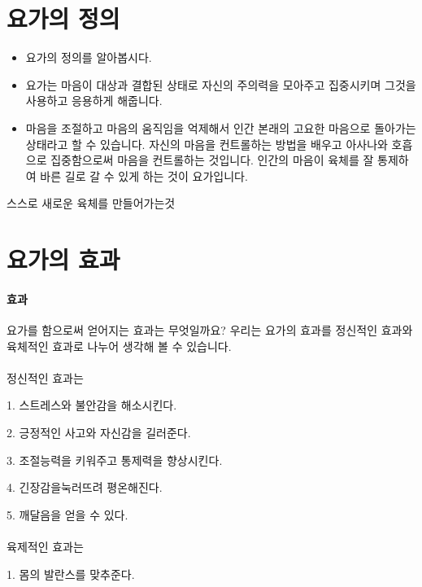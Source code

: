 \documentclass[12pt, a4paper, oneside]{book}
\let\stdsection\section
\renewcommand\section{\newpage\stdsection}
\begin{document}
\section{요가의 정의}


		\begin{itemize}[topsep=0.0em, parsep=0.0em, itemsep=0em, leftmargin=6.0em, labelwidth=3em, labelsep=3em] 
			\item 	요가의 정의를 알아봅시다.
			\item 	요가는 마음이 대상과 결합된 상태로 자신의 주의력을 모아주고 집중시키며 그것을 사용하고 응용하게 해줍니다.
			\item 	마음을 조절하고 마음의 움직임을 억제해서 인간 본래의 고요한 마음으로 돌아가는 상태라고  할 수 있습니다. 
					자신의 마음을 컨트롤하는 방법을 배우고 아사나와 호흡으로 집중함으로써 마음을 컨트롤하는 것입니다. 
					인간의 마음이 육체를 잘 통제하여 바른 길로 갈 수 있게 하는 것이 요가입니다.
		\end{itemize}

			스스로 새로운 육체를 만들어가는것


\section{요가의 효과}


\paragraph{효과}
요가를 함으로써 얻어지는 효과는 무엇일까요?
우리는 요가의 효과를 정신적인 효과와 육체적인 효과로 나누어 생각해 볼 수 있습니다.


\paragraph{}정신적인 효과는

1. 스트레스와 불안감을 해소시킨다.

2. 긍정적인 사고와 자신감을 길러준다.

3. 조절능력을 키워주고 통제력을 향상시킨다.

4. 긴장감을눅러뜨려 평온해진다.

5. 깨달음을 얻을 수 있다.



\paragraph{}육제적인 효과는 

1. 몸의 발란스를 맞추준다.
\end{document}
